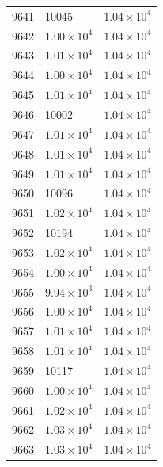 \begin{table}[H]
\begin{tabular}{lll}
9641 & 10045 & $\displaystyle 1.04 \times 10^{4}$ \\
9642 & $\displaystyle 1.00 \times 10^{4}$ & $\displaystyle 1.04 \times 10^{4}$ \\
9643 & $\displaystyle 1.01 \times 10^{4}$ & $\displaystyle 1.04 \times 10^{4}$ \\
9644 & $\displaystyle 1.00 \times 10^{4}$ & $\displaystyle 1.04 \times 10^{4}$ \\
9645 & $\displaystyle 1.01 \times 10^{4}$ & $\displaystyle 1.04 \times 10^{4}$ \\
9646 & 10002 & $\displaystyle 1.04 \times 10^{4}$ \\
9647 & $\displaystyle 1.01 \times 10^{4}$ & $\displaystyle 1.04 \times 10^{4}$ \\
9648 & $\displaystyle 1.01 \times 10^{4}$ & $\displaystyle 1.04 \times 10^{4}$ \\
9649 & $\displaystyle 1.01 \times 10^{4}$ & $\displaystyle 1.04 \times 10^{4}$ \\
9650 & 10096 & $\displaystyle 1.04 \times 10^{4}$ \\
9651 & $\displaystyle 1.02 \times 10^{4}$ & $\displaystyle 1.04 \times 10^{4}$ \\
9652 & 10194 & $\displaystyle 1.04 \times 10^{4}$ \\
9653 & $\displaystyle 1.02 \times 10^{4}$ & $\displaystyle 1.04 \times 10^{4}$ \\
9654 & $\displaystyle 1.00 \times 10^{4}$ & $\displaystyle 1.04 \times 10^{4}$ \\
9655 & $\displaystyle 9.94 \times 10^{3}$ & $\displaystyle 1.04 \times 10^{4}$ \\
9656 & $\displaystyle 1.00 \times 10^{4}$ & $\displaystyle 1.04 \times 10^{4}$ \\
9657 & $\displaystyle 1.01 \times 10^{4}$ & $\displaystyle 1.04 \times 10^{4}$ \\
9658 & $\displaystyle 1.01 \times 10^{4}$ & $\displaystyle 1.04 \times 10^{4}$ \\
9659 & 10117 & $\displaystyle 1.04 \times 10^{4}$ \\
9660 & $\displaystyle 1.00 \times 10^{4}$ & $\displaystyle 1.04 \times 10^{4}$ \\
9661 & $\displaystyle 1.02 \times 10^{4}$ & $\displaystyle 1.04 \times 10^{4}$ \\
9662 & $\displaystyle 1.03 \times 10^{4}$ & $\displaystyle 1.04 \times 10^{4}$ \\
9663 & $\displaystyle 1.03 \times 10^{4}$ & $\displaystyle 1.04 \times 10^{4}$ \\

\end{tabular}
\end{table}
